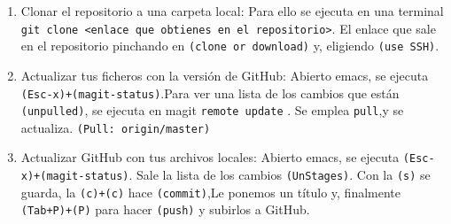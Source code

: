 \begin{enumerate}
\item Clonar el repositorio a una carpeta local:
  Para ello se ejecuta en una terminal
  \texttt{git clone <enlace que obtienes en el repositorio>}. El enlace
  que sale en el repositorio pinchando en \texttt{(clone or download)} y,
  eligiendo \texttt{(use SSH)}.

\item Actualizar tus ficheros con la versión de GitHub:
  Abierto emacs, se ejecuta \texttt{(Esc-x)+(magit-status)}.Para ver una
  lista de los cambios que están \texttt{(unpulled)}, se ejecuta en
  magit \texttt{remote update} . Se emplea \texttt{pull},y se actualiza.
  \texttt{(Pull: origin/master)}
\item Actualizar GitHub con tus archivos locales:
  Abierto emacs, se ejecuta \texttt{(Esc-x)+(magit-status)}. Sale la lista
  de los cambios \texttt{(UnStages)}. Con la \texttt{(s)} se guarda,
  la \texttt{(c)+(c)} hace \texttt{(commit)},Le ponemos un título y,
  finalmente \texttt{(Tab+P)+(P)} para hacer \texttt{(push)} y subirlos
  a GitHub.
\end{enumerate}